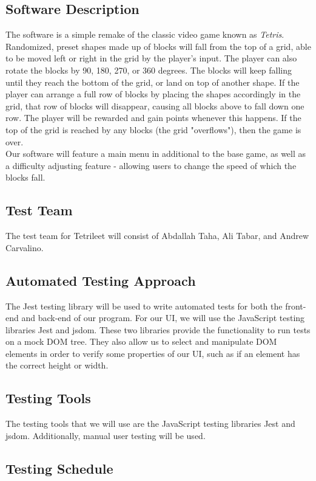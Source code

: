 \documentclass[12pt, titlepage]{article}
\begin{document}
\subsection{Software Description}

The software is a simple remake of the classic video game known as \emph{Tetris}. Randomized, preset shapes made up of blocks will fall from the top of a grid, able to be moved left or right in the grid by the player's input. The player can also rotate the blocks by 90, 180, 270, or 360 degrees. The blocks will keep falling until they reach the bottom of the grid, or land on top of another shape. If the player can arrange a full row of blocks by placing the shapes accordingly in the grid, that row of blocks will disappear, causing all blocks above to fall down one row. The player will be rewarded and gain points whenever this happens. If the top of the grid is reached by any blocks (the grid "overflows"), then the game is over.\\
Our software will feature a main menu in additional to the base game, as well as a difficulty adjusting feature - allowing users to change the speed of which the blocks fall.

\subsection{Test Team}
The test team for Tetrileet will consist of Abdallah Taha, Ali Tabar, and Andrew Carvalino.

\subsection{Automated Testing Approach}
The Jest testing library will be used to write automated tests for both the front-end and back-end of our program. For our UI, we will use the JavaScript testing libraries Jest and jsdom. These two libraries provide the functionality to run tests on a mock DOM tree. They also allow us to select and manipulate DOM elements in order to verify some properties of our UI, such as if an element has the correct height or width.

\subsection{Testing Tools}
The testing tools that we will use are the JavaScript testing libraries Jest and jsdom. Additionally, manual user testing will be used.

\subsection{Testing Schedule}
\end{document}

